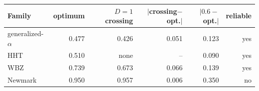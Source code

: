 \begin{tabular}{lrrrrr}\toprule
Family & optimum & $D=1$ crossing & $|$crossing$-$opt.$|$ & $|0.6-$opt.$|$ & reliable \\\midrule
generalized-$\alpha$ & 0.477 & 0.426 & 0.051 & 0.123 & yes \\
HHT & 0.510 & none & -- & 0.090 & yes \\
WBZ & 0.739 & 0.673 & 0.066 & 0.139 & yes \\
Newmark & 0.950 & 0.957 & 0.006 & 0.350 & no \\
\bottomrule\end{tabular}
